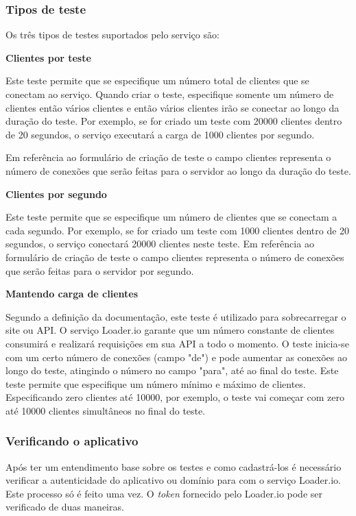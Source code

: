 \subsubsection{Tipos de teste}

  Os três tipos de testes suportados pelo serviço são:

  \textbf{Clientes por teste}

  Este teste permite que se especifique um número total de clientes que se conectam ao serviço. Quando criar o teste,
  especifique somente um número de clientes então vários clientes e então vários clientes irão se conectar ao longo da duração do teste.
  Por exemplo, se for criado um teste com 20000 clientes dentro de 20 segundos, o serviço executará a carga de
  1000 clientes por segundo.

  Em referência ao formulário de criação de teste o campo clientes representa o número de conexões que serão
  feitas para o servidor ao longo da duração do teste.

  \textbf{Clientes por segundo}

  Este teste permite que se especifique um número de clientes que se conectam a cada segundo. Por exemplo, se for criado
  um teste com 1000 clientes dentro de 20 segundos, o serviço conectará 20000 clientes neste teste.
  Em referência ao formulário de criação de teste o campo clientes representa o número de conexões que serão
  feitas para o servidor por segundo.

  \textbf{Mantendo carga de clientes}

  Segundo a definição da documentação, este teste é utilizado para sobrecarregar o site ou \ac{API}.
  O serviço Loader.io garante que um número constante de clientes consumirá e realizará requisições em
  sua \ac{API} a todo o momento.
  O teste inicia-se com um certo número de conexões (campo "de") e pode aumentar as conexões ao longo do teste,
  atingindo o número no campo "para", até ao final do teste.
  Este teste permite que especifique um número mínimo e máximo de clientes. Especificando zero clientes
  até 10000, por exemplo, o teste vai começar com zero até 10000 clientes simultâneos no final do teste.

\subsubsection{Verificando o aplicativo}

  Após ter um entendimento base sobre os testes e como cadastrá-los é necessário verificar a autenticidade do
  aplicativo ou domínio para com o serviço Loader.io. Este processo só é feito uma vez.
  O \textit{token} fornecido pelo Loader.io pode ser verificado de duas maneiras.

